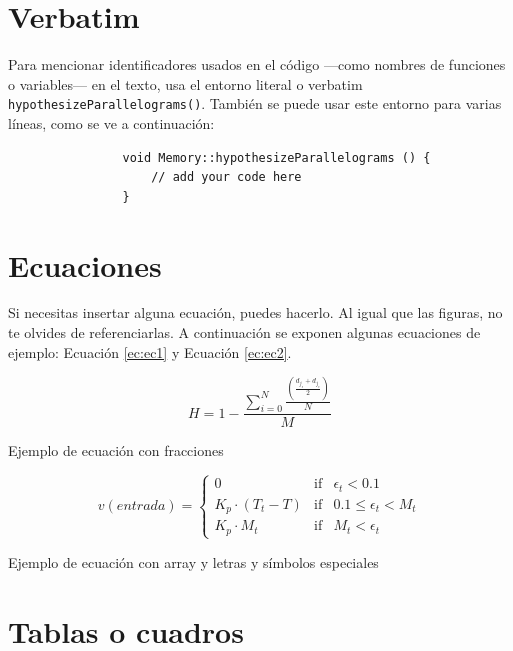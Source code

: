 			\section{Verbatim}
			
			Para mencionar identificadores usados en el código ---como nombres de funciones o variables--- en el texto, usa el entorno literal o verbatim \verb|hypothesizeParallelograms()|. También se puede usar este entorno para varias líneas, como se ve a continuación:
			
			\begin{verbatim}
				void Memory::hypothesizeParallelograms () {
					// add your code here
				}
			\end{verbatim}
			
			\section{Ecuaciones}
			
			Si necesitas insertar alguna ecuación, puedes hacerlo. Al igual que las figuras, no te olvides de referenciarlas. A continuación se exponen algunas ecuaciones de ejemplo: Ecuación \ref{ec:ec1} y Ecuación \ref{ec:ec2}.
			
			\begin{myequation}[h]
				\begin{equation}
					H = 1 - \frac{\sum_{i=0}^{N}\frac{(\frac{d_{j_s} + d_{j_e}}{2})}{N}}{M}
					\nonumber
					\label{ec:ec1}
				\end{equation}
				\caption[Ejemplo de ecuación con fracciones]{Ejemplo de ecuación con fracciones}
			\end{myequation} 
			
			\begin{myequation}[h]
				\begin{equation}
					v(entrada)= \left\{
					\begin{array}{lcc}
						0 & \mbox{if} & \epsilon_t < 0.1\\
						K_p\cdot{(T_{t}-T)} & \mbox{if}& 0.1 \leq \epsilon_t < M_t\\
						K_p \cdot M_t & \mbox{if}& M_t < \epsilon_t
					\end{array}
					\right.
					\label{ec:ec2}
				\end{equation}
				\caption[Ejemplo de ecuación con array y letras y símbolos especiales]{Ejemplo de ecuación con array y letras y símbolos especiales}
			\end{myequation}
			
			\section{Tablas o cuadros}
			
